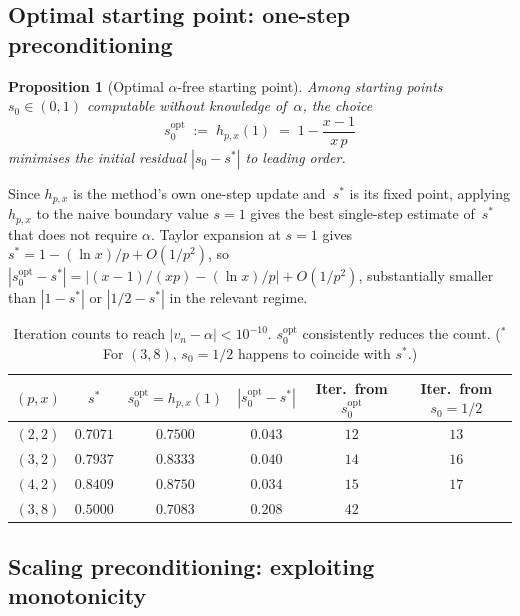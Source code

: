 \documentclass[11pt,a4paper]{article}
\newtheorem{proposition}[theorem]{Proposition}
\theoremstyle{definition}
\theoremstyle{remark}
\begin{document}
\subsection{Optimal starting point: one-step preconditioning}
\label{sec:optimal-start}

\begin{proposition}[Optimal $\alpha$-free starting point]\label{prop:optimal-start}
Among starting points $s_0 \in (0, 1)$ computable without knowledge
of~$\alpha$, the choice
\begin{equation}\label{eq:optimal-start}
  s_0^{\mathrm{opt}} \;:=\; h_{p,x}(1) \;=\; 1 - \frac{x - 1}{x\,p}
\end{equation}
minimises the initial residual $|s_0 - s^\ast|$ to leading order.
\end{proposition}

Since $h_{p,x}$ is the method's own one-step update and~$s^\ast$ is
its fixed point, applying $h_{p,x}$ to the naive boundary value
$s = 1$ gives the best single-step estimate of~$s^\ast$ that does not
require $\alpha$. Taylor expansion at $s = 1$ gives
$s^\ast = 1 - (\ln x)/p + O(1/p^2)$, so
$|s_0^{\mathrm{opt}} - s^\ast| = |(x-1)/(xp) - (\ln x)/p| + O(1/p^2)$,
substantially smaller than $|1 - s^\ast|$ or $|1/2 - s^\ast|$ in the
relevant regime.

\begin{table}[H]
\centering
\small
\begin{tabular}{@{}cccccc@{}}
\toprule
$(p, x)$ & $s^\ast$ & $s_0^{\mathrm{opt}} = h_{p,x}(1)$
         & $|s_0^{\mathrm{opt}} - s^\ast|$
         & Iter.\ from $s_0^{\mathrm{opt}}$ & Iter.\ from $s_0 = 1/2$ \\
\midrule
$(2, 2)$ & $0.7071$ & $0.7500$ & $0.043$ & $12$ & $13$ \\
$(3, 2)$ & $0.7937$ & $0.8333$ & $0.040$ & $14$ & $16$ \\
$(4, 2)$ & $0.8409$ & $0.8750$ & $0.034$ & $15$ & $17$ \\
$(3, 8)$ & $0.5000$ & $0.7083$ & $0.208$ & $42$ & \text{\textasteriskcentered} \\
\bottomrule
\end{tabular}
\caption{Iteration counts to reach $|v_n - \alpha| < 10^{-10}$.
$s_0^{\mathrm{opt}}$ consistently reduces the count. ($^\ast$For $(3,8)$,
$s_0 = 1/2$ happens to coincide with $s^\ast$.)}
\label{tab:optimal-start}
\end{table}

\subsection{Scaling preconditioning: exploiting monotonicity}
\label{sec:scaling}
\end{document}
